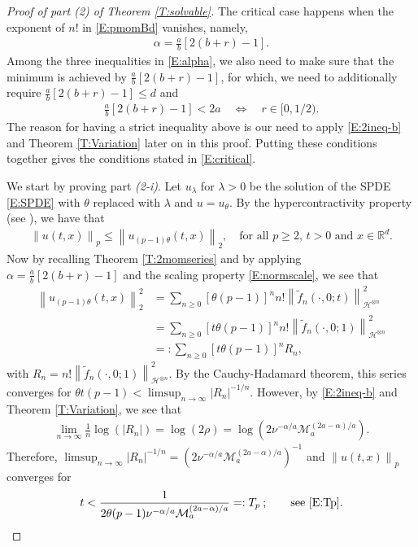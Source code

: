 \documentclass[a4paper,11pt]{article}
\numberwithin{equation}{section}
\numberwithin{equation}{section}
\theoremstyle{plain}
\theoremstyle{definition}
\newcommand{\Norm}[1]{\left\|  #1   \right\|}
\newcommand{\R}{\mathbb{R}}
\begin{document}
\begin{proof}[Proof of part (2) of Theorem \ref{T:solvable}]
  The critical case happens when the exponent of $n!$ in \eqref{E:pmomBd} vanishes, namely,
  \begin{align*}
    \alpha = \frac{a}{b}\left[2(b+r)-1\right].
  \end{align*}
  Among the three inequalities in \eqref{E:alpha}, we also need to make sure that the minimum is
  achieved by $\frac{a}{b}\left[2(b+r)-1\right]$, for which, we need to additionally require
  $\frac{a}{b}\left[2(b+r)-1\right] \le d$ and
  \begin{align*}
    \frac{a}{b}\left[2(b+r)-1\right] < 2a \quad \Longleftrightarrow \quad r\in[0,1/2).
  \end{align*}
  The reason for having a strict inequality above is our need to apply \eqref{E:2ineq-b} and Theorem
  \ref{T:Variation} later on in this proof. Putting these conditions together gives the conditions
  stated in \eqref{E:critical}.

  We start by proving part \textit{(2-i)}. Let $u_{\lambda}$ for $\lambda >0$ be the solution of the
  SPDE \eqref{E:SPDE} with $\theta$ replaced with $\lambda$ and $u=u_\theta$. By the
  hypercontractivity property (see \cite[Lemma B.1]{BCC21}), we have that
  \begin{align}
    \label{E:HyContr}
    \Norm{u(t,x)}_p \le \Norm{u_{(p-1)\theta}(t,x)}_2,   \quad \text{for all $p\ge 2$, $t>0$ and $x\in\R^d.$}
  \end{align}
  Now by recalling Theorem \ref{T:2momseries} and by applying $\alpha = \frac{a}{b}\left[ 2(b+r) - 1
  \right]$ and the scaling property \eqref{E:normscale}, we see that
  \begin{align*}
	 \Norm{u_{(p-1)\theta}(t,x)}_2^2
    & =  \sum_{n \ge 0} \left[\theta(p-1)\right]^n n! \Norm{\tilde{f}_n(\cdot,0;t)}_{ \mathcal{H}^{\otimes n }}^2  \\
    & =  \sum_{n \ge 0} \left[t\theta(p-1)\right]^n n! \Norm{\tilde{f}_n(\cdot,0;1)}_{ \mathcal{H}^{\otimes n }}^2 \\
    & =: \sum_{n \ge 0} \left[t\theta(p-1)\right]^n R_n,
  \end{align*}
  with $R_n = n! \Norm{\tilde{f}_n(\cdot,0;1)}_{ \mathcal{H}^{\otimes n }}^2$. By the
  Cauchy-Hadamard theorem, this series converges for $\theta t (p-1) < \limsup_{n \to \infty}
  |R_n|^{-1/n}$. However, by \eqref{E:2ineq-b} and Theorem \ref{T:Variation}, we see that
  \begin{align*}
    \lim_{n \to \infty} \frac{1}{n} \log(|R_n|) = \log\left( 2 \rho \right) =  \log\left( 2 \nu^{-\alpha/a} \mathcal{M}_a^{(2a-\alpha)/a} \right).
  \end{align*}
  Therefore, $\limsup_{n \to \infty} |R_n|^{-1/n} = (2 \nu^{-\alpha/a}
  \mathcal{M}_a^{(2a-\alpha)/a})^{-1}$ and $\Norm{u(t,x)}_p$ converges for
  \begin{align*}
    t  < \dfrac{1}{2 \theta (p-1) \nu^{-\alpha/a} \mathcal{M}_a^{(2a-\alpha)/a} } =: T_p\: ; \qquad \text{see \eqref{E:Tp}.}
  \end{align*}


\end{proof}
\end{document}
